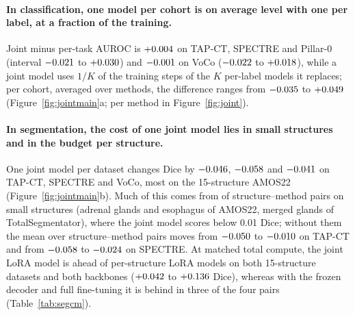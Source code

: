 \paragraph{In classification, one model per cohort is on average level with one per label, at a fraction of the training.} Joint minus per-task AUROC is $+0.004$ on TAP-CT, SPECTRE and Pillar-0 (interval $-0.021$ to $+0.030$) and $-0.001$ on VoCo ($-0.022$ to $+0.018$), while a joint model uses $1/K$ of the training steps of the $K$ per-label models it replaces; per cohort, averaged over methods, the difference ranges from $-0.035$ to $+0.049$ (Figure~\ref{fig:jointmain}a; per method in Figure~\ref{fig:joint}).

\paragraph{In segmentation, the cost of one joint model lies in small structures and in the budget per structure.}\label{sec:jointseg} One joint model per dataset changes Dice by $-0.046$, $-0.058$ and $-0.041$ on TAP-CT, SPECTRE and VoCo, most on the 15-structure AMOS22 (Figure~\ref{fig:jointmain}b). Much of this comes from \numSegcollapseN{} of \numSegcollapseCellsN{} structure--method pairs on small structures (adrenal glands and esophagus of AMOS22, merged glands of TotalSegmentator), where the joint model scores below 0.01 Dice; without them the mean over structure--method pairs moves from $-0.050$ to $-0.010$ on TAP-CT and from $-0.058$ to $-0.024$ on SPECTRE. At matched total compute, the joint LoRA model is ahead of per-structure LoRA models on both 15-structure datasets and both backbones ($+0.042$ to $+0.136$ Dice), whereas with the frozen decoder and full fine-tuning it is behind in three of the four pairs (Table~\ref{tab:segcm}).
